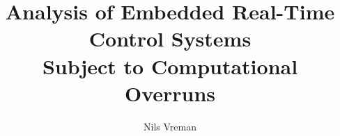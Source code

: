 \begin{titlepages}
    \author{Nils Vreman}
    \title{Analysis of Embedded Real-Time Control Systems \\Subject to Computational Overruns}
    \dedication{Dedicated to\dots}        %
\end{titlepages}
